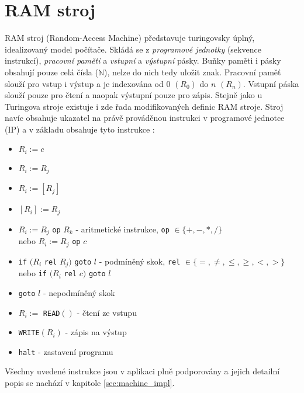 \section{RAM stroj}
RAM stroj (Random-Access Machine) představuje turingovsky úplný, idealizovaný model počítače. 
Skládá se z \emph{programové jednotky} (sekvence instrukcí), \emph{pracovní paměti} a \emph{vstupní} a \emph{výstupní} pásky.
Buňky paměti i pásky obsahují pouze celá čísla ($\mathbb{N}$), nelze do nich tedy uložit znak. 
Pracovní paměť slouží pro vstup i výstup a je indexována od $0$ $(R_0)$ do $n$ $(R_n)$. Vstupní páska slouží pouze pro čtení a naopak výstupní pouze pro zápis.
Stejně jako u Turingova stroje existuje i zde řada modifikovaných definic RAM stroje.
Stroj navíc obsahuje ukazatel na právě prováděnou instrukci v programové jednotce (IP) a v základu obsahuje tyto instrukce \cite{sawa_teoreticka}:
\begin{itemize}
	\item $R_i := c$
	\item $R_i := R_j$
	\item $R_i := [R_j]$
	\item $[R_i] := R_j$
	\item $R_i := R_j$ \texttt{op} $R_k$ - aritmetické instrukce, \texttt{op} $\in \{+, -, *, /\}$ \\ nebo $R_i := R_j$ \texttt{op} $c$
	\item \texttt{if} $(R_i$ \texttt{rel} $R_j)$ \texttt{goto} $l$ - podmíněný skok, \texttt{rel} $\in \{=, \neq, \leq, \geq, <, >\}$ \\ 
				nebo \texttt{if} $(R_i$ \texttt{rel} $c)$ \texttt{goto} $l$
	\item \texttt{goto} $l$ - nepodmíněný skok
	\item $R_i :=$ \texttt{READ}$()$ - čtení ze vstupu
	\item \texttt{WRITE}$(R_i)$ - zápis na výstup
	\item \texttt{halt} - zastavení programu
\end{itemize}
Všechny uvedené instrukce jsou v aplikaci plně podporovány a jejich detailní popis se nachází v kapitole \ref{sec:machine_impl}.


